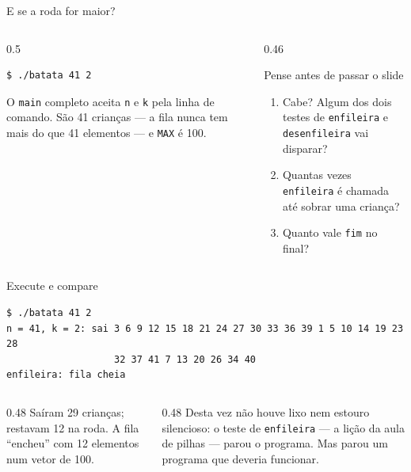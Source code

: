\documentclass[aspectratio=169]{beamer}
\begin{document}
\begin{frame}[fragile]{E se a roda for maior?}
  \begin{columns}[c]
    \begin{column}{0.5\textwidth}
\begin{lstlisting}[style=shellStyle]
$ ./batata 41 2
\end{lstlisting}
      \small O \texttt{main} completo aceita \texttt{n} e \texttt{k} pela
      linha de comando. São 41 crianças --- a fila nunca tem mais do que 41
      elementos --- e \texttt{MAX} é 100.
    \end{column}
    \begin{column}{0.46\textwidth}
      \begin{block}{Pense antes de passar o slide}
        \small
        \begin{enumerate}
          \item Cabe? Algum dos dois testes de \texttt{enfileira} e
            \texttt{desenfileira} vai disparar?
          \item Quantas vezes \texttt{enfileira} é chamada até sobrar uma
            criança?
          \item Quanto vale \texttt{fim} no final?
        \end{enumerate}
      \end{block}
    \end{column}
  \end{columns}
\end{frame}

\begin{frame}[fragile]{Execute e compare}
\begin{lstlisting}[style=shellStyle]
$ ./batata 41 2
n = 41, k = 2: sai 3 6 9 12 15 18 21 24 27 30 33 36 39 1 5 10 14 19 23 28
                   32 37 41 7 13 20 26 34 40
enfileira: fila cheia
\end{lstlisting}
  \begin{columns}[T]
    \begin{column}{0.48\textwidth}
      \small Saíram 29 crianças; restavam 12 na roda. A fila ``encheu''
      com 12 elementos num vetor de 100.
    \end{column}
    \begin{column}{0.48\textwidth}
      \small Desta vez não houve lixo nem estouro silencioso: o teste de
      \texttt{enfileira} --- a lição da aula de pilhas --- parou o programa.
      Mas parou um programa que deveria funcionar.
    \end{column}
  \end{columns}
\end{frame}
\end{document}
